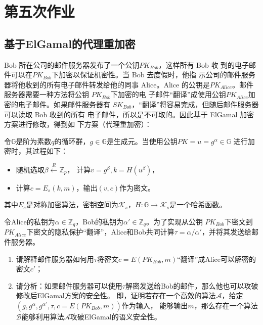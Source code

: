 \newpage
\chapter{第五次作业}

\section{基于ElGamal的代理重加密}

Bob 所在公司的邮件服务器发布了一个公钥$PK_{Bob}$，这样所有 Bob 收
到的电子邮件可以在$PK_{Bob}$下加密以保证机密性。当 Bob 去度假时，他指
示公司的邮件服务器将他收到的所有电子邮件转发给他的同事 Alice。Alice
的公钥是$PK_{Alice}$。邮件服务器需要一种方法将公钥 $PK_{Bob}$下加密的电
子邮件“翻译”成使用公钥$PK_{Alice}$加密的电子邮件。如果邮件服务器有
$SK_{Bob}$，“翻译”将容易完成，但随后邮件服务器可以读取 Bob 收到的所有
电子邮件，所以是不可取的。因此基于 ElGamal 加密方案进行修改，得到如
下方案（代理重加密）：

令$\mathbb{G}$是阶为素数$q$的循环群，$g\in \mathbb{G}$是生成元。当使用公钥$PK=u=g^\alpha\in\mathbb{G}$
进行加密时，其过程如下：

\begin{itemize}
    \item 随机选取$\beta\stackrel{R}{\leftarrow} \mathbb{Z}_p$， 计算$v=g^\beta, k=H(u^\beta)$，
    \item 计算$c=E_s(k,m)$，输出$(v,c)$作为密文。
\end{itemize}

其中$E_s$是对称加密算法，密钥空间为$\mathcal{K}_s$，$H:\mathbb{G}\rightarrow\mathcal{K}_s$是一个哈希函数。

令Alice的私钥为$\alpha \in \mathbb{Z}_q$，Bob的私钥为$\alpha' \in \mathbb{Z}_q$。为了实现从公钥
$PK_{Bob}$下密文到$PK_{Alice}$下密文的隐私保护“翻译”，Alice和Bob共同计算$\tau = \alpha / \alpha'$，并将其发送给邮件服务器。

\begin{enumerate}
    \item 请解释邮件服务器如何用$\tau$将密文$c=E(PK_{Bob},m)$“翻译”成Alice可以解密的密文$c'$；
    \item 请分析：如果邮件服务器可以使用$\tau$解密发送给Bob的邮件，那么他也可以攻破修改后ElGamal方案的安全性。
    即，证明若存在一个高效的算法$\mathcal{A}$，给定$(g,g^\alpha, g^{\alpha'},\tau, c=E(PK_{Bob},m))$作为输入，
    能够输出$m$，那么存在一个算法$\mathcal{B}$能够利用算法$\mathcal{A}$攻破ElGamal的语义安全性。
\end{enumerate}

